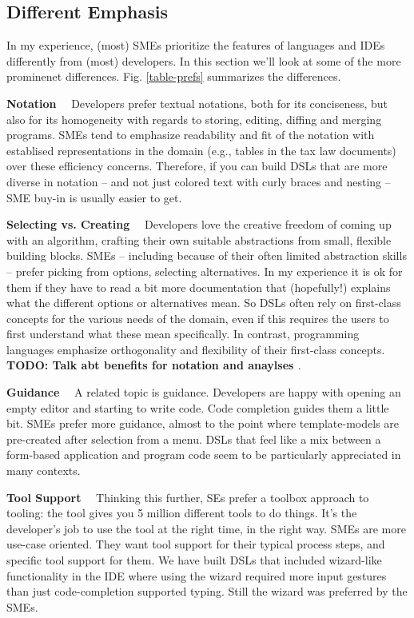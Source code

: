 \documentclass[runningheads]{llncs}
\newcommand\parhead[1]{\vspace{1mm}\noindent\textbf{{#1}}\ \ }
\newcommand{\fig}[1]{Fig. \ref{#1}}  %
\newcommand\todo[1]{\vspace{1mm}\noindent\textbf{\color{red} {{TODO: {#1}} }}}
\begin{document}
\subsection{Different Emphasis}

In my experience, (most) SMEs prioritize the features of languages and IDEs differently
from (most) developers. In this section we'll look at some of the more prominenet differences.
\fig{table-prefs} summarizes the differences.

\parhead{Notation} Developers prefer textual notations, both for its
conciseness, but also for its homogeneity with regards to storing, editing,
diffing and merging programs. SMEs tend to emphasize readability and fit of
the notation with establised representations in the domain (e.g., tables in
the tax law documents) over these efficiency concerns. Therefore, if you can
build DSLs that are more diverse in notation -- and not just colored text with
curly braces and nesting -- SME buy-in is usually easier to get.

\parhead{Selecting vs. Creating} Developers love the creative freedom of coming
up with an algorithm, crafting their own suitable abstractions from small,
flexible building blocks. SMEs -- including because of their often limited
abstraction skills -- prefer picking from options, selecting alternatives.
In my experience it is ok for them if they have to read a bit more documentation
that (hopefully!) explains what the different options or alternatives mean.
So DSLs often rely on first-class concepts for the various needs of the domain,
even if this requires the users to first understand what these mean
specifically. In contrast, programming languages emphasize orthogonality and
flexibility of their first-class concepts. \todo{Talk abt benefits for
notation and anaylses}.

\parhead{Guidance} A related topic is guidance. Developers are happy with
opening an empty editor and starting to write code. Code completion guides
them a little bit. SMEs prefer more guidance, almost to the point where 
template-models are pre-created after selection from a menu. DSLs that feel
like a mix between a form-based application and program code seem to be 
particularly appreciated in many contexts.

\parhead{Tool Support} Thinking this further, SEs prefer a toolbox approach
to tooling: the tool gives you 5 million different tools to do things. It's
the developer's job to use the tool at the right time, in the right way.
SMEs are more use-case oriented. They want tool support for their typical
process steps, and specific tool support for them. We have built DSLs that
included wizard-like functionality in the IDE where using the wizard required
more input gestures than just code-completion supported typing. Still the
wizard was preferred by the SMEs.
 
\end{document}
